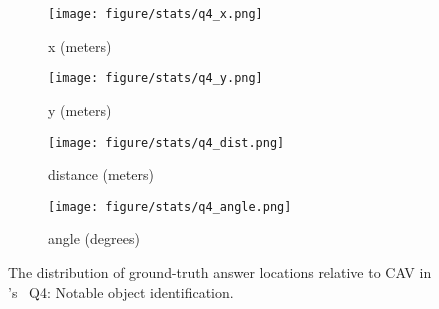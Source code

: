 \begin{figure}[!t]
        \centering
        \begin{subfigure}[t]{0.23\textwidth}
            \centering 
            \texttt{[image: figure/stats/q4\_x.png]}
            \vspace{-20pt}
            \caption[]%
            {{x (meters)}}    
        \end{subfigure}
        \hfill
        \begin{subfigure}[t]{0.23\textwidth}  
            \centering 
            \texttt{[image: figure/stats/q4\_y.png]}
            \vspace{-20pt}
            \caption[]%
            {{y (meters)}}
        \end{subfigure}

        \begin{subfigure}[t]{0.23\textwidth}
            \centering 
            \texttt{[image: figure/stats/q4\_dist.png]}
            \vspace{-20pt}
            \caption[]%
            {{distance (meters)}}
        \end{subfigure}
        \hfill
        \begin{subfigure}[t]{0.23\textwidth}
            \centering 
            \texttt{[image: figure/stats/q4\_angle.png]}
            \vspace{-20pt}
            \caption[]%
            {{angle (degrees)}}
        \end{subfigure}
        \hfill
        
        \vspace{-10pt}
        \caption[]
        {
        The distribution of ground-truth answer locations relative to CAV in \namedataset's \namevsplit~Q4: Notable object identification. 
        } 
        \label{fig:stats_v2v_q4}
        \vspace{-10pt}
\end{figure}

